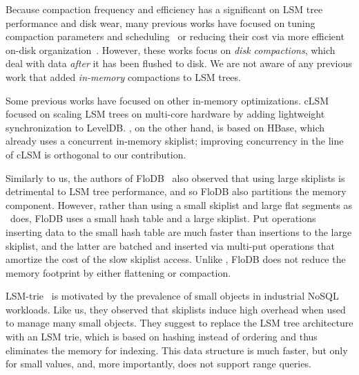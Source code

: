 






Because compaction frequency and efficiency has a significant on LSM tree performance and disk wear, 
many previous works have focused on tuning compaction parameters and scheduling~\cite{hbasetuning,rocksdb,
scylladbcompaction,universalcompaction,Sears:2012} or reducing their cost via more efficient on-disk organization~\cite{wisckey}. 
However, these works focus on \emph{disk compactions},
which deal with data \emph{after} it has been flushed to disk. We are not aware of any previous work that 
added \emph{in-memory} compactions to LSM trees.

Some previous works have focused on other in-memory optimizations. 
cLSM~\cite{clsm} focused on scaling LSM trees on multi-core hardware by adding lightweight synchronization to LevelDB. 
\sys, on the other hand, is based on HBase, which already uses a concurrent in-memory skiplist; improving concurrency
in the line of cLSM is orthogonal to our contribution.  

Similarly to us, the authors of FloDB~\cite{flodb} also observed that using large skiplists is detrimental to 
LSM tree performance, and so FloDB also partitions the memory component. However, rather than using 
a small skiplist and large flat segments as \sys\ does, FloDB  uses a small hash table and a large skiplist.
Put operations inserting data to the small hash table are much faster than insertions to the large skiplist, 
and the latter are batched and inserted via multi-put operations that amortize the cost of the slow skiplist access.
Unlike \sys, FloDB does not reduce the memory footprint by either flattening or compaction. 

LSM-trie~\cite{Wu2015} is motivated by the prevalence of small objects in industrial NoSQL workloads.  
Like us, they observed that skiplists induce high overhead when used to manage many small objects.  
They suggest to replace the LSM tree architecture with an LSM trie, which is based on hashing instead of ordering 
and thus eliminates the memory for indexing. This data structure is much faster, but only for small values, and, more importantly, does not
support range queries.


